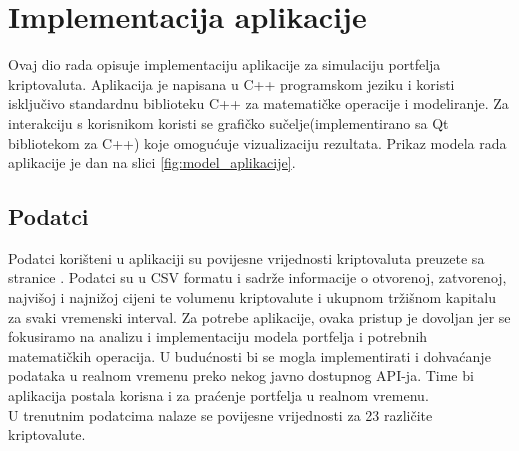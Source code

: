 \documentclass[zavrsnirad]{fer}
\begin{document}
\chapter{Implementacija aplikacije}
\label{pog:implementacija}
Ovaj dio rada opisuje implementaciju aplikacije za simulaciju
portfelja kriptovaluta. Aplikacija je napisana u C++ programskom
jeziku i koristi isključivo standardnu biblioteku C++ za matematičke
operacije i modeliranje. Za interakciju s korisnikom koristi se
grafičko sučelje(implementirano sa Qt bibliotekom za C++) koje
omogućuje vizualizaciju rezultata. Prikaz modela rada aplikacije
je dan na slici \ref{fig:model_aplikacije}.
\\

\section{Podatci}
\label{sek:podaci}
Podatci korišteni u aplikaciji su povijesne vrijednosti
kriptovaluta preuzete sa stranice \cite{1}.
Podatci su u CSV formatu i sadrže informacije o otvorenoj, zatvorenoj,
najvišoj i najnižoj cijeni te volumenu kriptovalute i ukupnom tržišnom
kapitalu za svaki vremenski interval. Za potrebe aplikacije,
ovaka pristup je dovoljan jer se fokusiramo na analizu i
implementaciju modela portfelja i potrebnih matematičkih operacija.
U budućnosti bi se mogla implementirati i dohvaćanje podataka
u realnom vremenu preko nekog javno dostupnog API-ja. Time bi
aplikacija postala korisna i za praćenje portfelja u realnom vremenu.\\
U trenutnim podatcima nalaze se povijesne vrijednosti za 23 različite kriptovalute.
\end{document}
